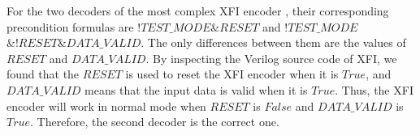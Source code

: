 \documentclass[journal]{IEEEtran}
\begin{document}
For the two decoders of the most complex XFI encoder \cite{IEEE80232002},
their corresponding precondition formulas are $!TEST\_MODE \& RESET$ and $!TEST\_MODE$ $\& !RESET \& DATA\_VALID$.
The only differences between them are the values of $RESET$ and $DATA\_VALID$.
By inspecting the Verilog source code of XFI,
we found that the $RESET$ is used to reset the XFI encoder when it is $True$,
and $DATA\_VALID$ means that the input data is valid when it is $True$.
Thus,
the XFI encoder will work in normal mode when $RESET$ is $False$ and $DATA\_VALID$ is $True$.
Therefore,
the second decoder is the correct one.







\end{document}
